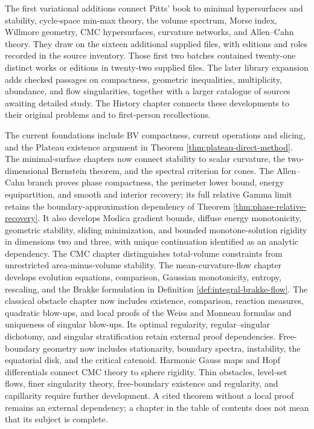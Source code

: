 \begin{remark}\label{rem:project-scope}
The first variational additions connect Pitts' book \cite{Pitts81} to minimal hypersurfaces and stability, cycle-space min-max theory, the volume spectrum, Morse index, Willmore geometry, CMC hypersurfaces, curvature networks, and Allen--Cahn theory. They draw on the sixteen additional supplied files, with editions and roles recorded in the source inventory. Those first two batches contained twenty-one distinct works or editions in twenty-two supplied files. The later library expansion adds checked passages on compactness, geometric inequalities, multiplicity, abundance, and flow singularities, together with a larger catalogue of sources awaiting detailed study. The History chapter connects these developments to their original problems and to first-person recollections.

The current foundations include BV compactness, current operations and slicing, and the Plateau existence argument in Theorem \ref{thm:plateau-direct-method}. The minimal-surface chapters now connect stability to scalar curvature, the two-dimensional Bernstein theorem, and the spectral criterion for cones. The Allen--Cahn branch proves phase compactness, the perimeter lower bound, energy equipartition, and smooth and interior recovery; its full relative Gamma limit retains the boundary-approximation dependency of Theorem \ref{thm:phase-relative-recovery}. It also develops Modica gradient bounds, diffuse energy monotonicity, geometric stability, sliding minimization, and bounded monotone-solution rigidity in dimensions two and three, with unique continuation identified as an analytic dependency. The CMC chapter distinguishes total-volume constraints from unrestricted area-minus-volume stability. The mean-curvature-flow chapter develops evolution equations, comparison, Gaussian monotonicity, entropy, rescaling, and the Brakke formulation in Definition \ref{def:integral-brakke-flow}. The classical obstacle chapter now includes existence, comparison, reaction measures, quadratic blow-ups, and local proofs of the Weiss and Monneau formulas and uniqueness of singular blow-ups. Its optimal regularity, regular--singular dichotomy, and singular stratification retain external proof dependencies. Free-boundary geometry now includes stationarity, boundary spectra, instability, the equatorial disk, and the critical catenoid. Harmonic Gauss maps and Hopf differentials connect CMC theory to sphere rigidity. Thin obstacles, level-set flows, finer singularity theory, free-boundary existence and regularity, and capillarity require further development. A cited theorem without a local proof remains an external dependency; a chapter in the table of contents does not mean that its subject is complete.


\end{remark}
